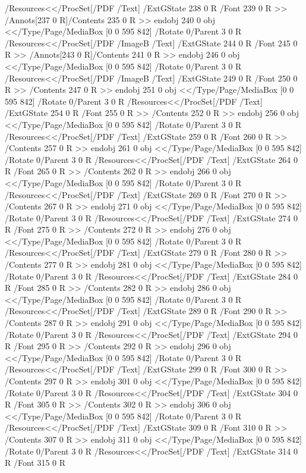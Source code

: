 {{{{{{{{{{{{{{{{{{{{{{{{{{{{/Resources<</ProcSet[/PDF /Text]
/ExtGState 238 0 R
/Font 239 0 R
>>
/Annots[237 0 R]/Contents 235 0 R
>>
endobj
240 0 obj
<</Type/Page/MediaBox [0 0 595 842]
/Rotate 0/Parent 3 0 R
/Resources<</ProcSet[/PDF /ImageB /Text]
/ExtGState 244 0 R
/Font 245 0 R
>>
/Annots[243 0 R]/Contents 241 0 R
>>
endobj
246 0 obj
<</Type/Page/MediaBox [0 0 595 842]
/Rotate 0/Parent 3 0 R
/Resources<</ProcSet[/PDF /ImageB /Text]
/ExtGState 249 0 R
/Font 250 0 R
>>
/Contents 247 0 R
>>
endobj
251 0 obj
<</Type/Page/MediaBox [0 0 595 842]
/Rotate 0/Parent 3 0 R
/Resources<</ProcSet[/PDF /Text]
/ExtGState 254 0 R
/Font 255 0 R
>>
/Contents 252 0 R
>>
endobj
256 0 obj
<</Type/Page/MediaBox [0 0 595 842]
/Rotate 0/Parent 3 0 R
/Resources<</ProcSet[/PDF /Text]
/ExtGState 259 0 R
/Font 260 0 R
>>
/Contents 257 0 R
>>
endobj
261 0 obj
<</Type/Page/MediaBox [0 0 595 842]
/Rotate 0/Parent 3 0 R
/Resources<</ProcSet[/PDF /Text]
/ExtGState 264 0 R
/Font 265 0 R
>>
/Contents 262 0 R
>>
endobj
266 0 obj
<</Type/Page/MediaBox [0 0 595 842]
/Rotate 0/Parent 3 0 R
/Resources<</ProcSet[/PDF /Text]
/ExtGState 269 0 R
/Font 270 0 R
>>
/Contents 267 0 R
>>
endobj
271 0 obj
<</Type/Page/MediaBox [0 0 595 842]
/Rotate 0/Parent 3 0 R
/Resources<</ProcSet[/PDF /Text]
/ExtGState 274 0 R
/Font 275 0 R
>>
/Contents 272 0 R
>>
endobj
276 0 obj
<</Type/Page/MediaBox [0 0 595 842]
/Rotate 0/Parent 3 0 R
/Resources<</ProcSet[/PDF /Text]
/ExtGState 279 0 R
/Font 280 0 R
>>
/Contents 277 0 R
>>
endobj
281 0 obj
<</Type/Page/MediaBox [0 0 595 842]
/Rotate 0/Parent 3 0 R
/Resources<</ProcSet[/PDF /Text]
/ExtGState 284 0 R
/Font 285 0 R
>>
/Contents 282 0 R
>>
endobj
286 0 obj
<</Type/Page/MediaBox [0 0 595 842]
/Rotate 0/Parent 3 0 R
/Resources<</ProcSet[/PDF /Text]
/ExtGState 289 0 R
/Font 290 0 R
>>
/Contents 287 0 R
>>
endobj
291 0 obj
<</Type/Page/MediaBox [0 0 595 842]
/Rotate 0/Parent 3 0 R
/Resources<</ProcSet[/PDF /Text]
/ExtGState 294 0 R
/Font 295 0 R
>>
/Contents 292 0 R
>>
endobj
296 0 obj
<</Type/Page/MediaBox [0 0 595 842]
/Rotate 0/Parent 3 0 R
/Resources<</ProcSet[/PDF /Text]
/ExtGState 299 0 R
/Font 300 0 R
>>
/Contents 297 0 R
>>
endobj
301 0 obj
<</Type/Page/MediaBox [0 0 595 842]
/Rotate 0/Parent 3 0 R
/Resources<</ProcSet[/PDF /Text]
/ExtGState 304 0 R
/Font 305 0 R
>>
/Contents 302 0 R
>>
endobj
306 0 obj
<</Type/Page/MediaBox [0 0 595 842]
/Rotate 0/Parent 3 0 R
/Resources<</ProcSet[/PDF /Text]
/ExtGState 309 0 R
/Font 310 0 R
>>
/Contents 307 0 R
>>
endobj
311 0 obj
<</Type/Page/MediaBox [0 0 595 842]
/Rotate 0/Parent 3 0 R
/Resources<</ProcSet[/PDF /Text]
/ExtGState 314 0 R
/Font 315 0 R
}}}}}}}}}}}}}}}}}}}}}}}}}}}}
